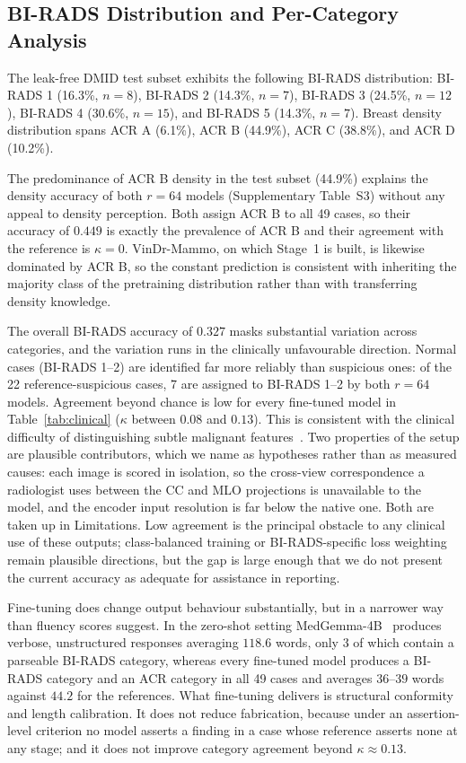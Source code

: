 \documentclass{wlscirep}
\begin{document}
\subsection*{BI-RADS Distribution and Per-Category Analysis}

The leak-free DMID test subset exhibits the following BI-RADS distribution: BI-RADS 1 (16.3\%, $n=8$), BI-RADS 2 (14.3\%, $n=7$), BI-RADS 3 (24.5\%, $n=12$), BI-RADS 4 (30.6\%, $n=15$), and BI-RADS 5 (14.3\%, $n=7$). Breast density distribution spans ACR A (6.1\%), ACR B (44.9\%), ACR C (38.8\%), and ACR D (10.2\%).

The predominance of ACR B density in the test subset (44.9\%) explains the density accuracy of both $r=64$ models (Supplementary Table~S3) without any appeal to density perception. Both assign ACR B to all 49 cases, so their accuracy of $0.449$ is exactly the prevalence of ACR B and their agreement with the reference is $\kappa = 0$. VinDr-Mammo, on which Stage~1 is built, is likewise dominated by ACR B, so the constant prediction is consistent with inheriting the majority class of the pretraining distribution rather than with transferring density knowledge.

The overall BI-RADS accuracy of $0.327$ masks substantial variation across categories, and the variation runs in the clinically unfavourable direction. Normal cases (BI-RADS 1--2) are identified far more reliably than suspicious ones: of the 22 reference-suspicious cases, 7 are assigned to BI-RADS 1--2 by both $r=64$ models. Agreement beyond chance is low for every fine-tuned model in Table~\ref{tab:clinical} ($\kappa$ between $0.08$ and $0.13$). This is consistent with the clinical difficulty of distinguishing subtle malignant features~\cite{sechopoulos2021artificial}. Two properties of the setup are plausible contributors, which we name as hypotheses rather than as measured causes: each image is scored in isolation, so the cross-view correspondence a radiologist uses between the CC and MLO projections is unavailable to the model, and the encoder input resolution is far below the native one. Both are taken up in Limitations. Low agreement is the principal obstacle to any clinical use of these outputs; class-balanced training or BI-RADS-specific loss weighting remain plausible directions, but the gap is large enough that we do not present the current accuracy as adequate for assistance in reporting.

Fine-tuning does change output behaviour substantially, but in a narrower way than fluency scores suggest. In the zero-shot setting MedGemma-4B~\cite{lin2024medgemma} produces verbose, unstructured responses averaging $118.6$ words, only 3 of which contain a parseable BI-RADS category, whereas every fine-tuned model produces a BI-RADS category and an ACR category in all 49 cases and averages $36$--$39$ words against $44.2$ for the references. What fine-tuning delivers is structural conformity and length calibration. It does not reduce fabrication, because under an assertion-level criterion no model asserts a finding in a case whose reference asserts none at any stage; and it does not improve category agreement beyond $\kappa \approx 0.13$.
\end{document}
